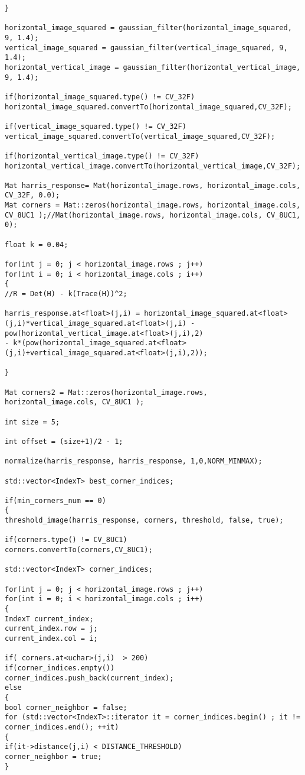 \begin{lstlisting}
}

horizontal_image_squared = gaussian_filter(horizontal_image_squared, 9, 1.4);
vertical_image_squared = gaussian_filter(vertical_image_squared, 9, 1.4);
horizontal_vertical_image = gaussian_filter(horizontal_vertical_image, 9, 1.4);

if(horizontal_image_squared.type() != CV_32F)
horizontal_image_squared.convertTo(horizontal_image_squared,CV_32F);

if(vertical_image_squared.type() != CV_32F)
vertical_image_squared.convertTo(vertical_image_squared,CV_32F);

if(horizontal_vertical_image.type() != CV_32F)
horizontal_vertical_image.convertTo(horizontal_vertical_image,CV_32F);

Mat harris_response= Mat(horizontal_image.rows, horizontal_image.cols, CV_32F, 0.0);
Mat corners = Mat::zeros(horizontal_image.rows, horizontal_image.cols, CV_8UC1 );//Mat(horizontal_image.rows, horizontal_image.cols, CV_8UC1, 0);

float k = 0.04;

for(int j = 0; j < horizontal_image.rows ; j++)
for(int i = 0; i < horizontal_image.cols ; i++)
{
//R = Det(H) - k(Trace(H))^2;

harris_response.at<float>(j,i) = horizontal_image_squared.at<float>(j,i)*vertical_image_squared.at<float>(j,i) -pow(horizontal_vertical_image.at<float>(j,i),2) 
- k*(pow(horizontal_image_squared.at<float>(j,i)+vertical_image_squared.at<float>(j,i),2));

}

Mat corners2 = Mat::zeros(horizontal_image.rows, horizontal_image.cols, CV_8UC1 );

int size = 5;

int offset = (size+1)/2 - 1;

normalize(harris_response, harris_response, 1,0,NORM_MINMAX);

std::vector<IndexT> best_corner_indices;

if(min_corners_num == 0)
{ 
threshold_image(harris_response, corners, threshold, false, true);

if(corners.type() != CV_8UC1)
corners.convertTo(corners,CV_8UC1);

std::vector<IndexT> corner_indices;

for(int j = 0; j < horizontal_image.rows ; j++)
for(int i = 0; i < horizontal_image.cols ; i++)
{
IndexT current_index;
current_index.row = j;
current_index.col = i;

if( corners.at<uchar>(j,i)  > 200)
if(corner_indices.empty())
corner_indices.push_back(current_index);
else
{
bool corner_neighbor = false;
for (std::vector<IndexT>::iterator it = corner_indices.begin() ; it != corner_indices.end(); ++it)
{
if(it->distance(j,i) < DISTANCE_THRESHOLD)
corner_neighbor = true;
}	


\end{lstlisting}
